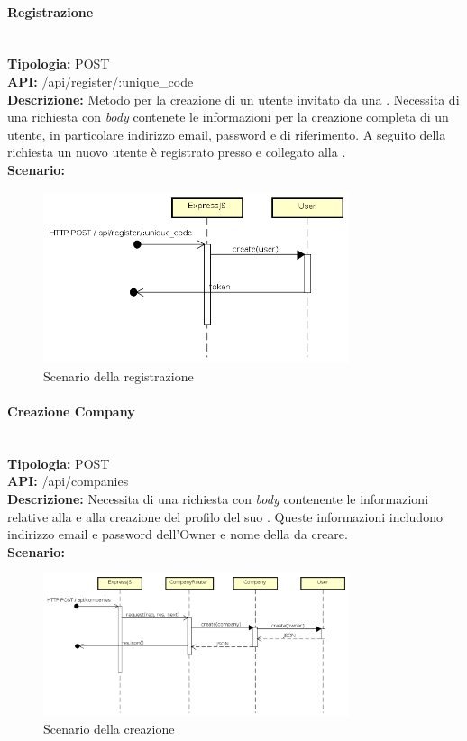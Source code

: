 \paragraph{Registrazione}\mbox{}\\
\textbf{Tipologia:} POST \\
\textbf{API:} /api/register/:unique\_code \\
\textbf{Descrizione:} Metodo per la creazione di un utente invitato da una . Necessita di una richiesta con \textit{body} contenete le informazioni per la creazione completa di un utente, in particolare indirizzo email, password e  di riferimento. A seguito della richiesta un nuovo utente è registrato presso  e collegato alla . \\
\textbf{Scenario:} 
\begin{figure}[H]
\centering
\includegraphics[width=0.8\textwidth]{res/sections/backend/sequence/(POST)register.png}
\caption{Scenario della registrazione}
\end{figure}

\newpage
\paragraph{Creazione Company}\mbox{}\\
\textbf{Tipologia:} POST \\
\textbf{API:} /api/companies \\
\textbf{Descrizione:} Necessita di una richiesta con \textit{body} contenente le informazioni relative alla  e alla creazione del profilo del suo . Queste informazioni includono indirizzo email e password dell'Owner e nome della  da creare. \\
\textbf{Scenario:} 
\begin{figure}[H]
\centering
\includegraphics[width=0.8\textwidth]{res/sections/backend/sequence/(POST)company.png}
\caption{Scenario della creazione }
\end{figure}

